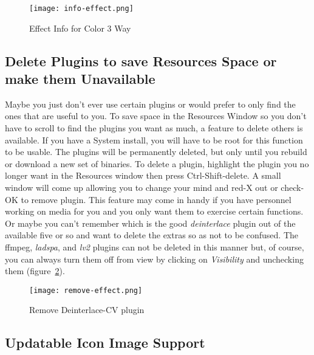 \begin{figure}[htpb]
    \centering
    \texttt{[image: info-effect.png]}
    \caption{Effect Info for Color 3 Way}
    \label{fig:info-effect}
\end{figure}

\subsection{Delete Plugins to save Resources Space or make them Unavailable}%
\label{sub:delete_plugin_resouces_unavaible}

Maybe you just don't ever use certain plugins or would prefer to only find the ones that are useful to you. To save space in the Resources Window so you don't have to scroll to find the plugins you want as much, a feature to delete others is available. If you have a System install, you will have to be root for this function to be usable. The plugins will be permanently deleted, but only until you rebuild or download a new set of \CGG{} binaries. To delete a plugin, highlight the plugin you no longer want in the Resources window then press Ctrl-Shift-delete. A small window will come up allowing you to change your mind and red-X out or check-OK to remove plugin. This feature may come in handy if you have personnel working on media for you and you only want them to exercise certain functions. Or maybe you can't remember which is the good \textit{deinterlace} plugin out of the available five or so and want to delete the extras so as not to be confused. The ffmpeg, \textit{ladspa}, and \textit{lv2} plugins can not be deleted in this manner but, of course, you can always turn them off from view by clicking on \textit{Visibility} and unchecking them (figure~\ref{fig:remove-effect}).

\begin{figure}[htpb]
    \centering
    \texttt{[image: remove-effect.png]}
    \caption{Remove Deinterlace-CV plugin}
    \label{fig:remove-effect}
\end{figure}

\subsection{Updatable Icon Image Support}%
\label{sub:updatable_icon_image_support}

